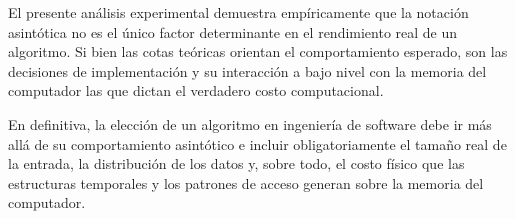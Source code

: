 El presente análisis experimental demuestra empíricamente que la notación asintótica no es el único factor determinante en el rendimiento real de un algoritmo. Si bien las cotas teóricas orientan el comportamiento esperado, son las decisiones de implementación y su interacción a bajo nivel con la memoria del computador las que dictan el verdadero costo computacional.

En definitiva, la elección de un algoritmo en ingeniería de software debe ir más allá de su comportamiento asintótico e incluir obligatoriamente el tamaño real de la entrada, la distribución de los datos y, sobre todo, el costo físico que las estructuras temporales y los patrones de acceso generan sobre la memoria del computador.
